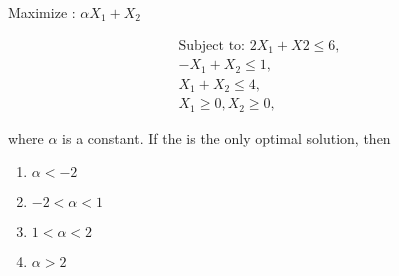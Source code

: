 \documentclass[journal]{IEEEtran}
\begin{document}
\begin{enumerate}
Maximize : $\alpha X_1+X_2$\\
\vspace{-3em}
\begin{adjustwidth}{-8.4cm}{0pt}
\begin{align*}
\text{Subject to: } 2X_1+X2\leq 6,\\
    -X_1+X_2\leq 1,\\
    X_1+X_2\leq 4,\\
    X_1\geq 0,X_2\geq 0,
\end{align*}
\end{adjustwidth}
where $\alpha$ is a constant. If the  is the only optimal solution, then 
\begin{multicols}{4}
    \begin{enumerate}
        \item $\alpha <-2$
        \item $-2<\alpha<1$
        \item $1<\alpha<2$
        \item $\alpha>2$
    \end{enumerate}
\end{multicols}
\end{enumerate}
\end{document}
